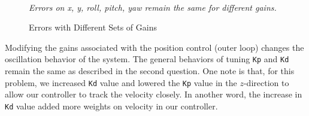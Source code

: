 \documentclass[letter, 10pt]{article}
\begin{document}
\begin{onehalfspacing}
\begin{figure}[h!]
	\centering
	 \\
	\caption{Errors with Different Sets of Gains}  {\it Errors on x, y, roll, pitch, yaw remain the same for different gains.}
\end{figure}

Modifying the gains associated with the position control (outer loop)
changes the oscillation behavior of the system. The general behaviors of tuning {\tt Kp} and {\tt Kd}
 remain the same as described in the second question. One note is that, for this problem, we increased
 {\tt Kd} value and lowered the {\tt Kp} value in the $z$-direction to allow our controller to 
track the velocity closely. In another word, the increase in {\tt Kd} value added more weights on velocity in our controller.


\end{onehalfspacing}
\end{document}
